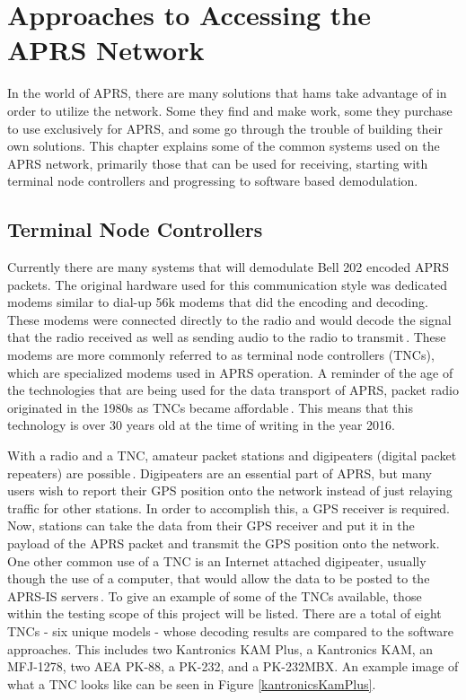 \chapter{Approaches to Accessing the APRS Network}
In the world of APRS, there are many solutions that hams take advantage of in order to utilize the network. Some they find and make work, some they purchase to use exclusively for APRS, and some go through the trouble of building their own solutions. This chapter explains some of the common systems used on the APRS network, primarily those that can be used for receiving, starting with terminal node controllers and progressing to software based demodulation.

\section{Terminal Node Controllers}
Currently there are many systems that will demodulate Bell 202 encoded APRS packets. The original hardware used for this communication style was dedicated modems similar to dial-up 56k modems that did the encoding and decoding. These modems were connected directly to the radio and would decode the signal that the radio received as well as sending audio to the radio to transmit\,\cite{Wolfgang2005}. These modems are more commonly referred to as terminal node controllers (TNCs), which are specialized modems used in APRS operation. A reminder of the age of the technologies that are being used for the data transport of APRS, packet radio originated in the 1980s as TNCs became affordable\,\cite{Helms1992}. This means that this technology is over 30 years old at the time of writing in the year 2016.

With a radio and a TNC, amateur packet stations and digipeaters (digital packet repeaters) are possible\,\cite{Group2012,Wiki2012}. Digipeaters are an essential part of APRS, but many users wish to report their GPS position onto the network instead of just relaying traffic for other stations. In order to accomplish this, a GPS receiver is required. Now, stations can take the data from their GPS receiver and put it in the payload of the APRS packet and transmit the GPS position onto the network. One other common use of a TNC is an Internet attached digipeater, usually though the use of a computer, that would allow the data to be posted to the APRS-IS servers\,\cite{Community2015}. To give an example of some of the TNCs available, those within the testing scope of this project will be listed. There are a total of eight TNCs - six unique models - whose decoding results are compared to the software approaches. This includes two Kantronics KAM Plus, a Kantronics KAM, an MFJ-1278, two AEA PK-88, a PK-232, and a PK-232MBX. An example image of what a TNC looks like can be seen in Figure \ref{kantronicsKamPlus}.

